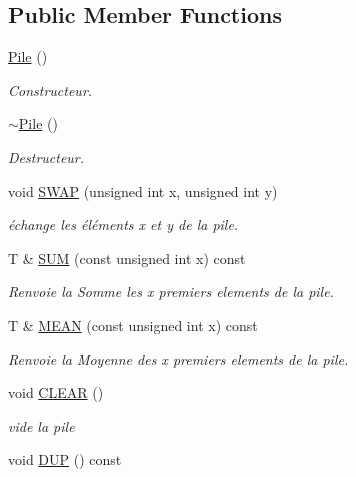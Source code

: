 \subsection*{Public Member Functions}
\begin{DoxyCompactItemize}
\item 
\hyperlink{classPile_a6393ea69d41a484a63f691bef44469a7}{Pile} ()
\begin{DoxyCompactList}\small\item\em Constructeur. \item\end{DoxyCompactList}\item 
\hyperlink{classPile_ac10aba315bae705a7821c41d5d31e11c}{$\sim$Pile} ()
\begin{DoxyCompactList}\small\item\em Destructeur. \item\end{DoxyCompactList}\item 
void \hyperlink{classPile_a685bd6ecb5c0c7805e4aa9f45e7a1289}{SWAP} (unsigned int x, unsigned int y)
\begin{DoxyCompactList}\small\item\em échange les éléments x et y de la pile. \item\end{DoxyCompactList}\item 
T \& \hyperlink{classPile_a35fc6cd5606215120f150629315c615a}{SUM} (const unsigned int x) const 
\begin{DoxyCompactList}\small\item\em Renvoie la Somme les x premiers elements de la pile. \item\end{DoxyCompactList}\item 
T \& \hyperlink{classPile_a5b576fb2729b6f1d79c05b8932b91588}{MEAN} (const unsigned int x) const 
\begin{DoxyCompactList}\small\item\em Renvoie la Moyenne des x premiers elements de la pile. \item\end{DoxyCompactList}\item 
\hypertarget{classPile_a0532e4cbf4f9521b09a30f5cd0f4f4ad}{
void \hyperlink{classPile_a0532e4cbf4f9521b09a30f5cd0f4f4ad}{CLEAR} ()}
\label{classPile_a0532e4cbf4f9521b09a30f5cd0f4f4ad}

\begin{DoxyCompactList}\small\item\em vide la pile \item\end{DoxyCompactList}\item 
\hypertarget{classPile_a8b4213827764783cb5b8463d81315055}{
void \hyperlink{classPile_a8b4213827764783cb5b8463d81315055}{DUP} () const }
\label{classPile_a8b4213827764783cb5b8463d81315055}


\end{DoxyCompactItemize}
